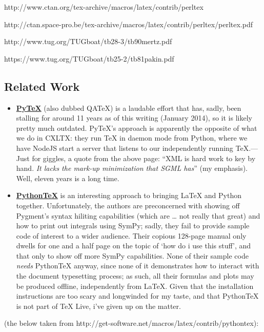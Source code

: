 http://www.ctan.org/tex-archive/macros/latex/contrib/perltex

http://ctan.space-pro.be/tex-archive/macros/latex/contrib/perltex/perltex.pdf

http://www.tug.org/TUGboat/tb28-3/tb90mertz.pdf

https://www.tug.org/TUGboat/tb25-2/tb81pakin.pdf

\subsection{Related Work}\label{related-work}

\begin{itemize}
\item
  \href{http://www.pytex.org/}{\textbf{PyTeX}} (also dubbed QATeX) is a
  laudable effort that has, sadly, been stalling for around 11 years as
  of this writing (January 2014), so it is likely pretty much outdated.
  PyTeX's approach is apparently the opposite of what we do in CXLTX:
  they run TeX in daemon mode from Python, where we have NodeJS start a
  server that listens to our independently running TeX.---Just for
  giggles, a quote from the above page: ``XML is hard work to key by
  hand. \emph{It lacks the mark-up minimization that SGML has}'' (my
  emphasis). Well, eleven years is a long time.
\item
  \href{https://github.com/gpoore/pythontex}{\textbf{PythonTeX}} is an
  interesting approach to bringing LaTeX and Python together.
  Unfortunately, the authors are preconcerned with showing off Pygment's
  syntax hiliting capabilities (which are \ldots{} not really that
  great) and how to print out integrals using SymPy; sadly, they fail to
  provide sample code of interest to a wider audience. Their copious
  128-page manual only dwells for one and a half page on the topic of
  `how do i use this stuff', and that only to show off more SymPy
  capabilities. None of their sample code \emph{needs} PythonTeX anyway,
  since none of it demonstrates how to interact with the document
  typesetting process; as such, all their formulas and plots may be
  produced offline, independently from LaTeX. Given that the
  installation instructions are too scary and longwinded for my taste,
  and that PythonTeX is not part of TeX Live, i've given up on the
  matter.
\end{itemize}

(the below taken from
http://get-software.net/macros/latex/contrib/pythontex):

